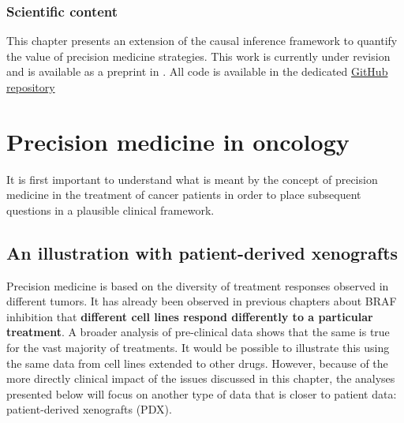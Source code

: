 \documentclass[a4paper,12pt,twoside,onecolumn,openright,final,oldfontcommands]{memoir}
\begin{document}
\subsubsection*{Scientific content}\label{scientific-content-6}

This chapter presents an extension of the causal inference framework to
quantify the value of precision medicine strategies. This work is
currently under revision and is available as a preprint in
\citet{beal2020causal}. All code is available in the dedicated
\href{https://github.com/JonasBeal/Causal_Precision_Medicine}{GitHub
repository}

\section{Precision medicine in
oncology}\label{precision-medicine-in-oncology}

It is first important to understand what is meant by the concept of
precision medicine in the treatment of cancer patients in order to place
subsequent questions in a plausible clinical framework.

\subsection{An illustration with patient-derived
xenografts}\label{main-PDX}

Precision medicine is based on the diversity of treatment responses
observed in different tumors. It has already been observed in previous
chapters about BRAF inhibition that \textbf{different cell lines respond
differently to a particular treatment}. A broader analysis of
pre-clinical data shows that the same is true for the vast majority of
treatments. It would be possible to illustrate this using the same data
from cell lines extended to other drugs. However, because of the more
directly clinical impact of the issues discussed in this chapter, the
analyses presented below will focus on another type of data that is
closer to patient data: patient-derived xenografts (PDX).
\end{document}
